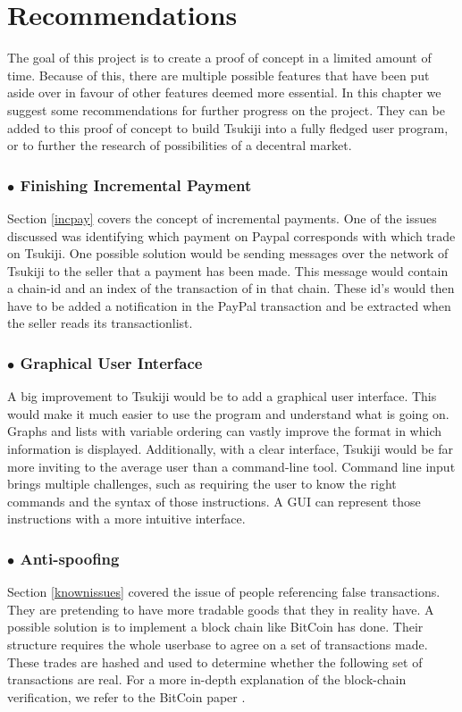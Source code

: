 \section{Recommendations}
\label{recommendations}
The goal of this project is to create a proof of concept in a limited amount of time.
Because of this, there are multiple possible features that have been put aside over in favour of other features deemed more essential.
In this chapter we suggest some recommendations for further progress on the project.
They can be added to this proof of concept to build Tsukiji into a fully fledged user program, or to further the research of possibilities of a decentral market.

\subsubsection*{$\bullet$ Finishing Incremental Payment}
Section \ref{incpay} covers the concept of incremental payments. One of the issues discussed was identifying which payment on Paypal corresponds with which trade on Tsukiji.
One possible solution would be sending messages over the network of Tsukiji to the seller that a payment has been made.
This message would contain a chain-id and an index of the transaction of in that chain.
These id's would then have to be added a notification in the PayPal transaction and be extracted when the seller reads its transactionlist.

\subsubsection*{$\bullet$ Graphical User Interface}
A big improvement to Tsukiji would be to add a graphical user interface. 
This would make it much easier to use the program and understand what is going on.
Graphs and lists with variable ordering can vastly improve the format in which information is displayed.
Additionally, with a clear interface, Tsukiji would be far more inviting to the average user than a command-line tool.
Command line input brings multiple challenges, such as requiring the user to know the right commands and the syntax of those instructions.
A GUI can represent those instructions with a more intuitive interface.

\subsubsection*{$\bullet$ Anti-spoofing}
Section \ref{knownissues} covered the issue of people referencing false transactions.
They are pretending to have more tradable goods that they in reality have.
A possible solution is to implement a block chain like BitCoin has done.
Their structure requires the whole userbase to agree on a set of transactions made.
These trades are hashed and used to determine whether the following set of transactions are real.
For a more in-depth explanation of the block-chain verification, we refer to the BitCoin paper \cite{bitcoin}.

